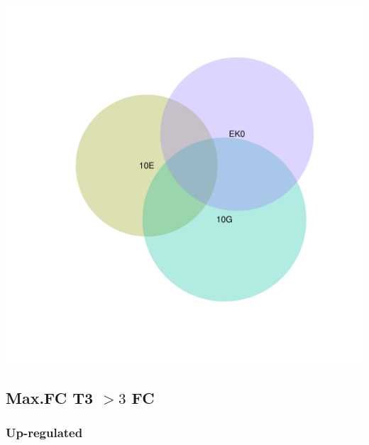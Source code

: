 \documentclass{article}\usepackage[]{graphicx}\usepackage[]{color}
\newenvironment{knitrout}{}{} %
\begin{document}
\begin{knitrout}
\color{fgcolor}

{\centering \includegraphics[width=1\linewidth,height=.4\textheight]{figure/minimal-venn_t2_3fc_down_euler-1} 

}



\end{knitrout}
\clearpage

\subsection{Max.FC T3 $>3$ FC}
\subsubsection{Up-regulated}
\end{document}
